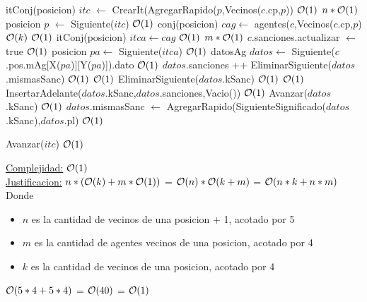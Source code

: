 \begin{Algoritmos}
\begin{algorithm}[H]
\begin{algorithmic}[1]
	\State itConj(posicion) $itc$ $\gets$ CrearIt(AgregarRapido($p$,Vecinos($c$.cp,$p$)) \Comment $\mathcal{O}(1)$
	 \Comment $n*\mathcal{O}(1)$
		\State posicion $p$ $\gets$ Siguiente($itc$) \Comment $\mathcal{O}(1)$
		\State conj(posicion) $cag \gets$ agentes($c$,Vecinos($c$.cp,$p$) \Comment $\mathcal{O}(k)$
		 \Comment $\mathcal{O}(1)$
		\State itConj(posicion) $itca \gets cag$ \Comment $\mathcal{O}(1)$
			 \Comment $m*\mathcal{O}(1)$
				\State $c$.sanciones.actualizar $\gets$ true \Comment $\mathcal{O}(1)$
				\State posicion $pa \gets$ Siguiente($itca$) \Comment $\mathcal{O}(1)$
				\State datosAg $datos \gets$ Siguiente($c$.pos.mAg[X($pa$)][Y($pa$)]).dato \Comment $\mathcal{O}(1)$
				\State $datos$.sanciones ++
				\State EliminarSiguiente($datos$.mismasSanc) \Comment $\mathcal{O}(1)$
				 \Comment $\mathcal{O}(1)$
					\State EliminarSiguiente($datos$.kSanc) \Comment $\mathcal{O}(1)$
				\EndIf
				 \Comment $\mathcal{O}(1)$
					\State InsertarAdelante($datos$.kSanc,$datos$.sanciones,Vacio()) \Comment $\mathcal{O}(1)$
				\Else
					\State Avanzar($datos$.kSanc) \Comment $\mathcal{O}(1)$
				\EndIf
				\State $datos$.mismasSanc $\gets$ AgregarRapido(SiguienteSignificado($datos$.kSanc),$datos$.pl) \Comment $\mathcal{O}(1)$
			\EndWhile
			
		\EndIf
		\State Avanzar($itc$) \Comment $\mathcal{O}(1)$
	\EndWhile
	\EndProcedure
\end{algorithmic}
\underline{Complejidad:} $\mathcal{O}(1)$\\
\underline{Justificacion:} $n*(\mathcal{O}(k) + m*\mathcal{O}(1))$ = $\mathcal{O}(n)*\mathcal{O}(k+m)$ = $\mathcal{O}(n*k + n*m)$\\
Donde
\begin{itemize}
	\item $n$ es la cantidad de vecinos de una posicion + 1, acotado por 5
	\item $m$ es la cantidad de agentes vecinos de una posicion, acotado por 4
	\item $k$ es la cantidad de vecinos de una posicion, acotado por 4
\end{itemize}
$\mathcal{O}(5*4 + 5*4)$ = $\mathcal{O}(40)$ = $\mathcal{O}(1)$

\end{algorithm}



\end{Algoritmos}
